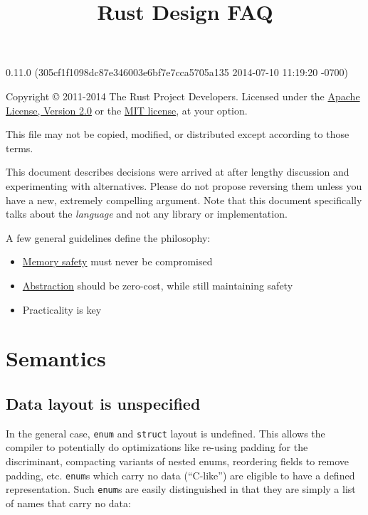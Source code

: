 \documentclass[]{article}
\title{Rust Design FAQ}
\begin{document}
\maketitle

0.11.0 (305cf1f1098dc87e346003e6bf7e7cca5705a135 2014-07-10 11:19:20 -0700)

Copyright © 2011-2014 The Rust Project Developers. Licensed under the
\href{http://www.apache.org/licenses/LICENSE-2.0}{Apache License,
Version 2.0} or the \href{http://opensource.org/licenses/MIT}{MIT
license}, at your option.

This file may not be copied, modified, or distributed except according
to those terms.

{
\hypersetup{linkcolor=black}
\setcounter{tocdepth}{3}
\tableofcontents
}
This document describes decisions were arrived at after lengthy
discussion and experimenting with alternatives. Please do not propose
reversing them unless you have a new, extremely compelling argument.
Note that this document specifically talks about the \emph{language} and
not any library or implementation.

A few general guidelines define the philosophy:

\begin{itemize}
\itemsep1pt\parskip0pt
\item
  \href{http://en.wikipedia.org/wiki/Memory_safety}{Memory safety} must
  never be compromised
\item
  \href{http://en.wikipedia.org/wiki/Abstraction_\%28computer_science\%29}{Abstraction}
  should be zero-cost, while still maintaining safety
\item
  Practicality is key
\end{itemize}

\section{Semantics}\label{semantics}

\subsection{Data layout is
unspecified}\label{data-layout-is-unspecified}

In the general case, \texttt{enum} and \texttt{struct} layout is
undefined. This allows the compiler to potentially do optimizations like
re-using padding for the discriminant, compacting variants of nested
enums, reordering fields to remove padding, etc. \texttt{enum}s which
carry no data (``C-like'') are eligible to have a defined
representation. Such \texttt{enum}s are easily distinguished in that
they are simply a list of names that carry no data:
\end{document}
